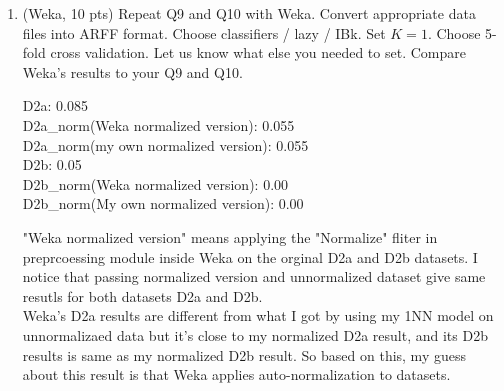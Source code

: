 \documentclass[a4paper]{article}
\theoremstyle{definition}
\newenvironment{soln}{
    \leavevmode\color{blue}\ignorespaces
}{}
\begin{document}
\begin{enumerate}
\item (Weka, 10 pts)
Repeat Q9 and Q10 with Weka.
Convert appropriate data files into ARFF format.
Choose classifiers / lazy / IBk.
Set $K=1$.
Choose 5-fold cross validation.
Let us know what else you needed to set.  Compare Weka's results to your Q9 and Q10.

\begin{soln}
D2a: 0.085\\
D2a\_norm(Weka normalized version): 0.055\\
D2a\_norm(my own normalized version): 0.055 \\
D2b: 0.05\\
D2b\_norm(Weka normalized version): 0.00\\
D2b\_norm(My own normalized version): 0.00

"Weka normalized version"  means applying the "Normalize" fliter in preprcoessing module inside Weka on the orginal D2a and D2b datasets.
I notice that passing normalized version and unnormalized dataset give same resutls for both datasets D2a and D2b.\\
Weka's D2a results are different from what I got by using my 1NN model on unnormalizaed data but it's close to my normalized D2a result,  and its D2b results is same as my normalized D2b result.
So based on this, my guess about this result is that Weka applies auto-normalization to datasets.
\end{soln}

\end{enumerate}


\end{document}
